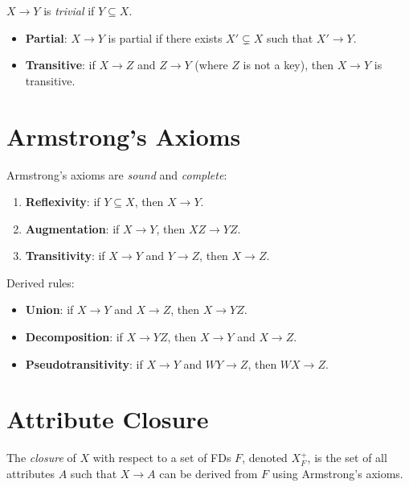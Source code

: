 \begin{definition}
$X \to Y$ is \emph{trivial} if $Y \subseteq X$.
\end{definition}

\begin{definition}
\begin{itemize}
    \item \textbf{Partial}: $X \to Y$ is partial if there exists $X' \subsetneq X$
          such that $X' \to Y$.
    \item \textbf{Transitive}: if $X \to Z$ and $Z \to Y$ (where $Z$ is not a key),
          then $X \to Y$ is transitive.
\end{itemize}
\end{definition}

\section{Armstrong's Axioms}

\begin{theorem}
Armstrong's axioms are \emph{sound} and \emph{complete}:
\begin{enumerate}
    \item \textbf{Reflexivity}: if $Y \subseteq X$, then $X \to Y$.
    \item \textbf{Augmentation}: if $X \to Y$, then $XZ \to YZ$.
    \item \textbf{Transitivity}: if $X \to Y$ and $Y \to Z$, then $X \to Z$.
\end{enumerate}
Derived rules:
\begin{itemize}
    \item \textbf{Union}: if $X \to Y$ and $X \to Z$, then $X \to YZ$.
    \item \textbf{Decomposition}: if $X \to YZ$, then $X \to Y$ and $X \to Z$.
    \item \textbf{Pseudotransitivity}: if $X \to Y$ and $WY \to Z$, then $WX \to Z$.
\end{itemize}
\end{theorem}

\section{Attribute Closure}

\begin{definition}[Closure $X^+$]
The \emph{closure} of $X$ with respect to a set of FDs $F$, denoted $X^+_F$,
is the set of all attributes $A$ such that $X \to A$ can be derived from $F$
using Armstrong's axioms.
\end{definition}

